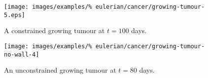 \begin{figure}[!hptb]
\centering
\texttt{[image: images/examples/\%
eulerian/cancer/growing-tumour-5.eps]}
\caption{A constrained growing tumour at $t=100$ days.}
\label{tumour-growth-constrained-5}
\end{figure}

\begin{figure}[!hptb]
\centering
\texttt{[image: images/examples/\%
eulerian/cancer/growing-tumour-no-wall-4]}
\caption{An unconstrained growing tumour at $t=80$ days.}
\label{tumour-growth-no-wall-4}
\end{figure}

%

